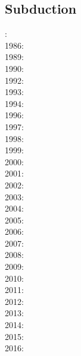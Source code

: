 \subsection*{Subduction}

: \cite{thar85}\\
1986: \cite{jarr86}\\
1989: \cite{boww89}\\
1990: \cite{hstt90}\\
1992: \cite{zhgu92}\cite{whbw92}\\
1993: \cite{jope93}\cite{dvnm93}\\
1994: \cite{zhgu94}\cite{wibe94}\cite{wdbo94a}\cite{wdbo94b}\\
1996: \cite{chri96}\\
1997: \cite{hajc97}\cite{kisa97}\\
1998: \cite{itki98}\cite{buwg98}\cite{brmy98}\\
1999: \cite{hagu99}\cite{befo99}\\
2000: \cite{tesc00}\cite{brky00}\cite{bemh00}\\
2001: \cite{bujl01}\cite{bugw01}\cite{chys01}\\
2002: \cite{civv02}\cite{clbb02}\\
2003: \cite{refm03}\\
2004: \cite{toba04}\cite{bocj04}\cite{bejn04}\\
2005: \cite{jalo05}\cite{lahb05}\\
2006: \cite{degw06}\cite{rohu06}\\
2007: \cite{artd07}\cite{yaab07}\cite{cubh07}\cite{civv07}\\
2008: \cite{yaba08}\cite{ozrs08}\cite{dihf08}\cite{wabj08}\cite{wabj08b}\cite{boht08b}
\cite{boht08a}\cite{baso08}\\
2009: \cite{yahb09}\cite{bill09}\cite{fagb09}\cite{bejb09}\cite{kecw09}\\
2010: \cite{hagr10}\cite{lobh10}\\
2011: \cite{lixg11}\cite{list11}\cite{bubj11}\cite{bagw11b}\cite{cafz11}\\
2012: \cite{anwb12}\cite{jahu12}\cite{jabi12}\cite{jabk12}\cite{lixg12}\cite{lixg13}
\cite{ronb12}\cite{tebu12}\cite{thka12}\cite{bova12}\cite{civs12}\cite{camo12}\cite{cafa12}\\
2013: \cite{nabg13}\cite{hage13}\cite{ancv13}\cite{namu13}\cite{yosh13}\cite{zhgt13}
\cite{jabr13}\cite{izht13}\cite{luws13}\cite{dusc13}\cite{tibb13}\cite{bubj13}\cite{scmo13}\\
2014: \cite{robn14}\cite{hond14}\cite{ronc14}\\
2015: \cite{bemm15}\cite{bomv15}\cite{bogf15}\cite{ceag15}\cite{kifr15}\\
2016: \cite{tomy16}

